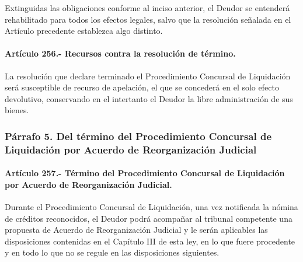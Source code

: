 \documentclass[
]{book}
\begin{document}
Extinguidas las obligaciones conforme al inciso anterior, el Deudor se entenderá rehabilitado para todos los efectos legales, salvo que la resolución señalada en el Artículo precedente establezca algo distinto.

\hypertarget{artuxedculo-256.--recursos-contra-la-resoluciuxf3n-de-tuxe9rmino.}{%
\paragraph*{Artículo 256.- Recursos contra la resolución de término.}\label{artuxedculo-256.--recursos-contra-la-resoluciuxf3n-de-tuxe9rmino.}}

La resolución que declare terminado el Procedimiento Concursal de Liquidación será susceptible de recurso de apelación, el que se concederá en el solo efecto devolutivo, conservando en el intertanto el Deudor la libre administración de sus bienes.

\hypertarget{puxe1rrafo-5.-del-tuxe9rmino-del-procedimiento-concursal-de-liquidaciuxf3n-por-acuerdo-de-reorganizaciuxf3n-judicial}{%
\subsubsection*{Párrafo 5. Del término del Procedimiento Concursal de Liquidación por Acuerdo de Reorganización Judicial}\label{puxe1rrafo-5.-del-tuxe9rmino-del-procedimiento-concursal-de-liquidaciuxf3n-por-acuerdo-de-reorganizaciuxf3n-judicial}}

\hypertarget{artuxedculo-257.--tuxe9rmino-del-procedimiento-concursal-de-liquidaciuxf3n-por-acuerdo-de-reorganizaciuxf3n-judicial.}{%
\paragraph*{Artículo 257.- Término del Procedimiento Concursal de Liquidación por Acuerdo de Reorganización Judicial.}\label{artuxedculo-257.--tuxe9rmino-del-procedimiento-concursal-de-liquidaciuxf3n-por-acuerdo-de-reorganizaciuxf3n-judicial.}}

Durante el Procedimiento Concursal de Liquidación, una vez notificada la nómina de créditos reconocidos, el Deudor podrá acompañar al tribunal competente una propuesta de Acuerdo de Reorganización Judicial y le serán aplicables las disposiciones contenidas en el Capítulo III de esta ley, en lo que fuere procedente y en todo lo que no se regule en las disposiciones siguientes.
\end{document}
